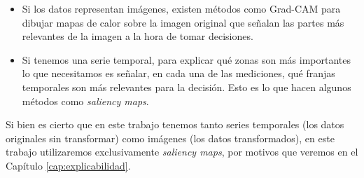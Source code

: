 \begin{itemize}
	\item Si los datos representan imágenes, existen métodos como Grad-CAM para dibujar mapas de calor sobre la imagen original que señalan las partes más relevantes de la imagen a la hora de tomar decisiones.
	\item Si tenemos una serie temporal, para explicar qué zonas son más importantes lo que necesitamos es señalar, en cada una de las mediciones, qué franjas temporales son más relevantes para la decisión. Esto es lo que hacen algunos métodos como \emph{saliency maps}.
\end{itemize}

\par

Si bien es cierto que en este trabajo tenemos tanto series temporales (los datos originales sin transformar) como imágenes (los datos transformados), en este trabajo utilizaremos exclusivamente \emph{saliency maps}, por motivos que veremos en el Capítulo \ref{cap:explicabilidad}.

